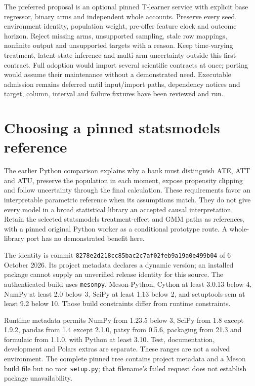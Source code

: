 The preferred proposal is an optional pinned T-learner service with explicit
base regressor, binary arms and independent whole accounts. Preserve every
seed, environment identity, population weight, pre-offer feature clock and
outcome horizon. Reject missing arms, unsupported sampling, stale row mappings,
nonfinite output and unsupported targets with a reason. Keep time-varying
treatment, latent-state inference and multi-arm uncertainty outside this first
contract. Full adoption would import several scientific contracts at once;
porting would assume their maintenance without a demonstrated need. Executable
admission remains deferred until input/import paths, dependency notices and
target, column, interval and failure fixtures have been reviewed and run.
\label{exec14:causalml-end}


\section{Choosing a pinned statsmodels reference}
\label{sec:exec24-statsmodels-reuse}
The earlier Python comparison explains why a bank must distinguish ATE, ATT and ATU, preserve the population in each moment, expose propensity clipping and follow uncertainty through the final calculation. These requirements favor an interpretable parametric reference when its assumptions match. They do not give every model in a broad statistical library an accepted causal interpretation. Retain the selected statsmodels treatment-effect and GMM paths as references, with a pinned original Python worker as a conditional prototype route. A whole-library port has no demonstrated benefit here.~\citep{exec20_python_effect_source,exec20_python_effect_reference}

The identity is commit \texttt{8278e2d218cc85bac2c7af02feb9a19a0e499b04} of 6 October 2026. Its project metadata declares a dynamic version; an installed package cannot supply an unverified release identity for this source. The authenticated build uses \texttt{mesonpy}, Meson-Python, Cython at least 3.0.13 below 4, NumPy at least 2.0 below 3, SciPy at least 1.13 below 2, and setuptools-scm at least 9.2 below 10. Those build constraints differ from runtime constraints.~\citep{exec24_statsmodels_distribution}

Runtime metadata permits NumPy from 1.23.5 below 3, SciPy from 1.8 except 1.9.2, pandas from 1.4 except 2.1.0, patsy from 0.5.6, packaging from 21.3 and formulaic from 1.1.0, with Python at least 3.10. Test, documentation, development and Polars extras are separate. These ranges are not a solved environment. The complete pinned tree contains project metadata and a Meson build file but no root \texttt{setup.py}; that filename's failed request does not establish package unavailability.~\citep{exec24_statsmodels_distribution}

